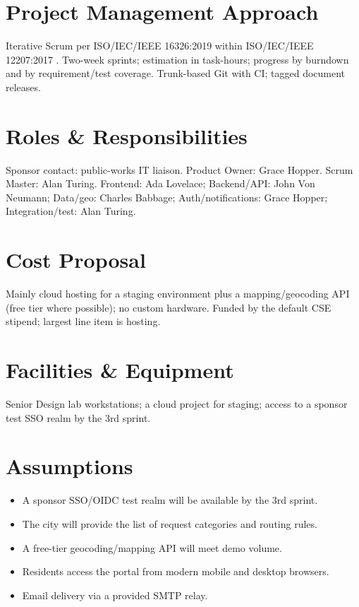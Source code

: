 \documentclass[11pt,letterpaper]{article}
\begin{document}
\section{Project Management Approach}
Iterative Scrum \cite{Rubin2012, SchwaberSutherland2020} per ISO/IEC/IEEE 16326:2019
\cite{ISO16326} within ISO/IEC/IEEE 12207:2017 \cite{ISO12207}. Two-week sprints;
estimation in task-hours; progress by burndown and by requirement/test coverage.
Trunk-based Git with CI; tagged document releases.

\section{Roles \& Responsibilities}
Sponsor contact: public-works IT liaison. Product Owner: Grace Hopper. Scrum Master:
Alan Turing. Frontend: Ada Lovelace; Backend/API: John Von Neumann; Data/geo:
Charles Babbage; Auth/notifications: Grace Hopper; Integration/test: Alan Turing.

\section{Cost Proposal}
Mainly cloud hosting for a staging environment plus a mapping/geocoding API (free
tier where possible); no custom hardware. Funded by the default CSE stipend; largest
line item is hosting.

\section{Facilities \& Equipment}
Senior Design lab workstations; a cloud project for staging; access to a sponsor
test SSO realm by the 3rd sprint.

\section{Assumptions}
\begin{itemize}
  \item A sponsor SSO/OIDC test realm will be available by the 3rd sprint.
  \item The city will provide the list of request categories and routing rules.
  \item A free-tier geocoding/mapping API will meet demo volume.
  \item Residents access the portal from modern mobile and desktop browsers.
  \item Email delivery via a provided SMTP relay.
\end{itemize}
\end{document}
